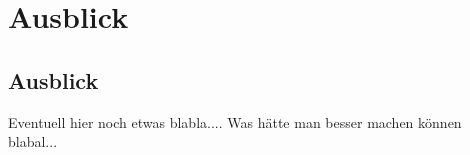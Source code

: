 \ifSTANDALONE
\section{Ausblick}
\fi
\ifEMBED
\subsection{Ausblick}
\fi
	Eventuell hier noch etwas blabla.... Was hätte man besser machen können blabal...
